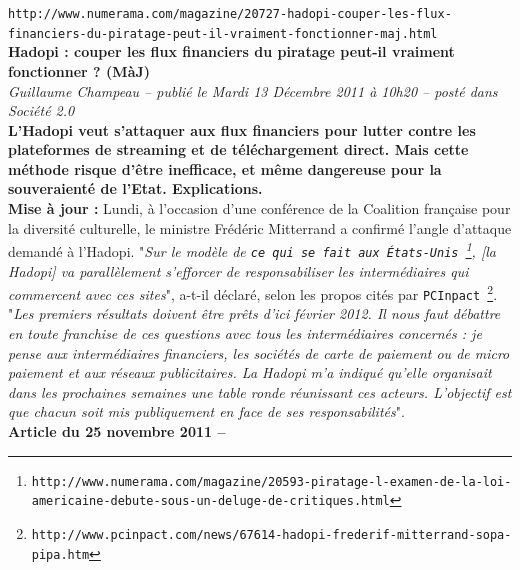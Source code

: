 \documentclass[11pt,twoside,a4paper]{article}
\begin{document}
\clearpage

\texttt{http://www.numerama.com/magazine/20727-hadopi-couper-les-flux-financiers-du-piratage-peut-il-vraiment-fonctionner-maj.html}~\\

\textbf{Hadopi : couper les flux financiers du piratage peut-il vraiment fonctionner ? (M{\`a}J)}~\\

\emph{\small  Guillaume Champeau -- publi{\'e} le Mardi 13 D{\'e}cembre 2011 {\`a} 10h20 -- post{\'e} dans Soci{\'e}t{\'e} 2.0 }~\\

\textbf{L'Hadopi veut s'attaquer aux flux financiers pour lutter contre les plateformes de streaming et de t{\'e}l{\'e}chargement direct. Mais cette m{\'e}thode risque d'{\^e}tre inefficace, et m{\^e}me dangereuse pour la souveraient{\'e} de l'Etat. Explications. }~\\

\textbf{Mise {\`a} jour : }Lundi, {\`a} l'occasion d'une conf{\'e}rence de la Coalition fran\c{c}aise pour la diversit{\'e} culturelle, le ministre Fr{\'e}d{\'e}ric Mitterrand a confirm{\'e} l'angle d'attaque demand{\'e} {\`a} l'Hadopi. "\emph{Sur le mod{\`e}le de \texttt{ce qui se fait aux {\'E}tats-Unis~\footnote{\texttt{http://www.numerama.com/magazine/20593-piratage-l-examen-de-la-loi-americaine-debute-sous-un-deluge-de-critiques.html}}}, [la Hadopi] va parall{\`e}lement s'efforcer de responsabiliser les interm{\'e}diaires qui commercent avec ces sites}", a-t-il d{\'e}clar{\'e}, selon les propos cit{\'e}s par \texttt{PCInpact~\footnote{\texttt{http://www.pcinpact.com/news/67614-hadopi-frederif-mitterrand-sopa-pipa.htm}}}. "\emph{Les premiers r{\'e}sultats doivent {\^e}tre pr{\^e}ts d'ici f{\'e}vrier 2012. Il nous faut d{\'e}battre en toute franchise de ces questions avec tous les interm{\'e}diaires concern{\'e}s : je pense aux interm{\'e}diaires financiers, les soci{\'e}t{\'e}s de carte de paiement ou de micro paiement et aux r{\'e}seaux publicitaires. La Hadopi m'a indiqu{\'e} qu'elle organisait dans les prochaines semaines une table ronde r{\'e}unissant ces acteurs. L'objectif est que chacun soit mis publiquement en face de ses responsabilit{\'e}s}". ~\\

\textbf{Article du 25 novembre 2011 -- }~\\
\end{document}
